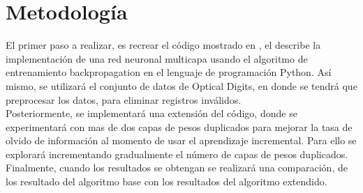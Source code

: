 \chapter{Metodología}
	
	
    El primer paso a realizar, es recrear el código mostrado en \cite{bullinaria2009}, el describe la implementación de una red neuronal multicapa usando el algoritmo de entrenamiento backpropagation en el lenguaje de programación Python. 
    Así mismo, se utilizará el conjunto de datos de Optical Digits, en donde se tendrá que preprocesar los datos, para eliminar registros inválidos.\\
    
    Posteriormente, se implementará una extensión del código, donde se experimentará con mas de dos capas de pesos duplicados para mejorar la tasa de olvido de información al momento de usar el aprendizaje incremental.  Para ello se explorará incrementando gradualmente el número de capas de pesos duplicados.\\
    
    Finalmente, cuando los resultados se obtengan se realizará una comparación, de los resultado del algoritmo base con los resultados del algoritmo extendido.
    


